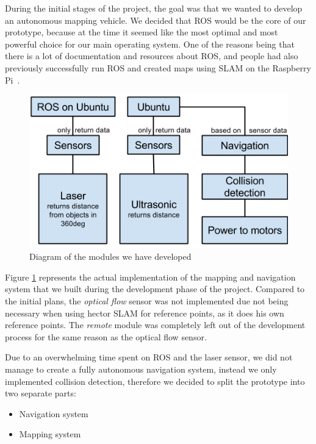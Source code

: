 During the initial stages of the project, the goal was that we wanted to develop an autonomous mapping vehicle. We decided that ROS would be the core of our prototype, because at the time it seemed like the most optimal and most powerful choice for our main operating system. One of the reasons being that there is a lot of documentation and resources about ROS, and people had also previously successfully run ROS and created maps using SLAM on the Raspberry Pi~\cite{pibot}\cite{pibotbook}.

\begin{figure}[H]
	\centering
	\includegraphics[scale=.7]{images/developmentdiagram2.png}
	\caption{Diagram of the modules we have developed}
	\label{fig:developmentdiagram2}
\end{figure}

Figure \ref{fig:developmentdiagram2} represents the actual implementation of the mapping and navigation system that we built during the development phase of the project. Compared to the initial plans, the \textit{optical flow} sensor was not implemented due not being necessary when using hector SLAM for reference points, as it does his own reference points. The \textit{remote} module was completely left out of the development process for the same reason as the optical flow sensor.

Due to an overwhelming time spent on ROS and the laser sensor, we did not manage to create a fully autonomous navigation system, instead we only implemented collision detection, therefore we decided to split the prototype into two separate parts: 
\begin{itemize}
	\item Navigation system
	\item Mapping system
\end{itemize}

